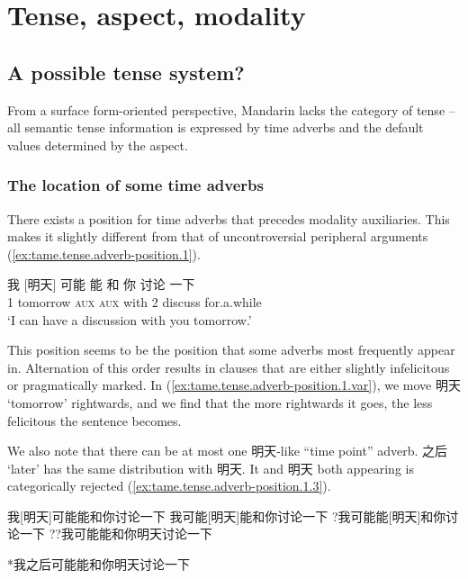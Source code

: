 \documentclass[UTF8, a4paper, oneside, scheme=plain, 12pt]{ctexrep}
\newcommand{\translate}[1]{`#1'}
\newcommand*{\category}[1]{\textsc{#1}}
\begin{document}
\chapter{Tense, aspect, modality}

\section{A possible tense system?}\label{sec:tam.tense}

From a surface form-oriented perspective, 
Mandarin lacks the category of tense -- 
all semantic tense information is 
expressed by time adverbs 
and the default values determined by the aspect.

\subsection{The location of some time adverbs}

There exists a position for time adverbs that precedes modality auxiliaries.
This makes it slightly different from that 
of uncontroversial peripheral arguments
(\ref{ex:tame.tense.adverb-position.1}).

\begin{exe}
    \ex\label{ex:tame.tense.adverb-position.1}
    \gll 我 [明天] 可能 能 和 你 讨论 一下 \\
    1 tomorrow \category{aux} \category{aux} with 2 discuss for.a.while \\
    \glt\translate{I can have a discussion with you tomorrow.}
\end{exe}

This position seems to be the position that some adverbs most frequently appear in.
Alternation of this order results in 
clauses that are either slightly infelicitous 
or pragmatically marked. 
In (\ref{ex:tame.tense.adverb-position.1.var}),
we move 明天 \translate{tomorrow} rightwards,
and we find that the more rightwards it goes,
the less felicitous the sentence becomes.

We also note that there can be at most one 明天-like ``time point'' adverb.
之后 \translate{later} has the same distribution with 明天.
It and 明天 both appearing is categorically rejected 
(\ref{ex:tame.tense.adverb-position.1.3}).

\begin{exe}
    \ex\label{ex:tame.tense.adverb-position.1.var} \begin{xlist}
        \ex 我[明天]可能能和你讨论一下
        \ex 我可能[明天]能和你讨论一下
        \ex ?我可能能[明天]和你讨论一下
        \ex ??我可能能和你明天讨论一下
    \end{xlist}

    \ex\label{ex:tame.tense.adverb-position.1.3} *我之后可能能和你明天讨论一下
\end{exe}
\end{document}
